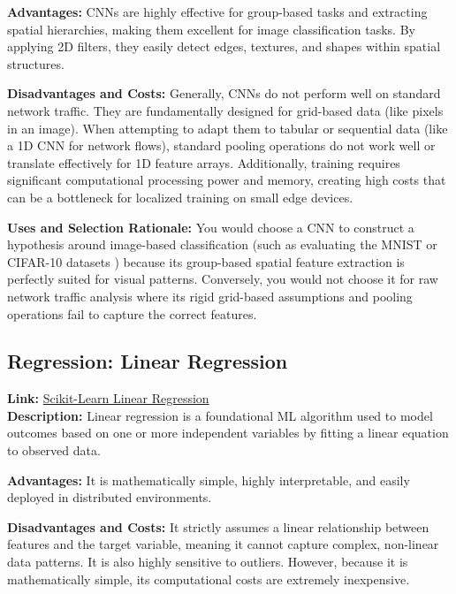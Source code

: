 \documentclass[letterpaper]{article}
\begin{document}
\textbf{Advantages:} CNNs are highly effective for group-based tasks and extracting spatial hierarchies, making them excellent for image classification tasks. By applying 2D filters, they easily detect edges, textures, and shapes within spatial structures.

\textbf{Disadvantages and Costs:} Generally, CNNs do not perform well on standard network traffic. They are fundamentally designed for grid-based data (like pixels in an image). When attempting to adapt them to tabular or sequential data (like a 1D CNN for network flows), standard pooling operations do not work well or translate effectively for 1D feature arrays. Additionally, training requires significant computational processing power and memory, creating high costs that can be a bottleneck for localized training on small edge devices.

\textbf{Uses and Selection Rationale:} You would choose a CNN to construct a hypothesis around image-based classification (such as evaluating the MNIST or CIFAR-10 datasets \parencite{mnist, cifar10}) because its group-based spatial feature extraction is perfectly suited for visual patterns. Conversely, you would not choose it for raw network traffic analysis where its rigid grid-based assumptions and pooling operations fail to capture the correct features.

\vspace{1em}

\subsection*{Regression: Linear Regression}
\textbf{Link:} \href{https://scikit-learn.org/stable/modules/generated/sklearn.linear_model.LinearRegression.html}{Scikit-Learn Linear Regression} \\
\textbf{Description:} Linear regression is a foundational ML algorithm used to model outcomes based on one or more independent variables by fitting a linear equation to observed data. 

\textbf{Advantages:} It is mathematically simple, highly interpretable, and easily deployed in distributed environments. 

\textbf{Disadvantages and Costs:} It strictly assumes a linear relationship between features and the target variable, meaning it cannot capture complex, non-linear data patterns. It is also highly sensitive to outliers. However, because it is mathematically simple, its computational costs are extremely inexpensive.
\end{document}
